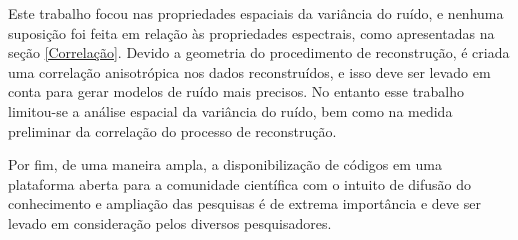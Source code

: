 Este trabalho focou nas propriedades espaciais da variância do ruído, e nenhuma suposição foi feita em relação às propriedades espectrais, como apresentadas na seção \ref{Correlação}. Devido a geometria do procedimento de reconstrução, é criada uma correlação anisotrópica nos dados reconstruídos, e isso deve ser levado em conta para gerar modelos de ruído mais precisos. No entanto esse trabalho limitou-se a análise espacial da variância do ruído, bem como na medida preliminar da correlação do processo de reconstrução.

Por fim, de uma maneira ampla, a disponibilização de códigos em uma plataforma aberta para a comunidade científica com o intuito de difusão do conhecimento e ampliação das pesquisas é de extrema importância e deve ser levado em consideração pelos diversos pesquisadores. 









